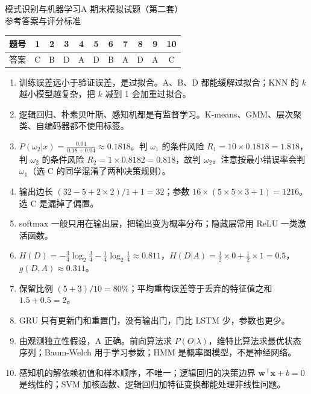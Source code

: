 
\geometry{left=2.4cm,right=2.4cm}
\renewcommand{\coursename}{模式识别与机器学习A\quad 期末模拟试题（第二套）参考答案与评分标准}
\fancyfootoffset[L]{0pt}


\begin{center}
{\LARGE\heiti 模式识别与机器学习A 期末模拟试题（第二套）}\\[4pt]
{\Large\heiti 参考答案与评分标准}
\end{center}

\begin{center}
\renewcommand{\arraystretch}{1.3}
\begin{tabular}{|c|*{10}{c|}}\hline
题号 & 1 & 2 & 3 & 4 & 5 & 6 & 7 & 8 & 9 & 10\\ \hline
答案 & C & B & D & A & D & B & A & D & A & C\\ \hline
\end{tabular}
\end{center}
\begin{enumerate}[label=\arabic*.]
\item 训练误差远小于验证误差，是过拟合。A、B、D 都能缓解过拟合；KNN 的 $k$ 越小模型越复杂，把 $k$ 减到 1 会加重过拟合。
\item 逻辑回归、朴素贝叶斯、感知机都是有监督学习。K-means、GMM、层次聚类、自编码器都不使用标签。
\item $P(\omega_2|x)=\frac{0.04}{0.18+0.04}\approx0.1818$。判 $\omega_1$ 的条件风险 $R_1=10\times0.1818=1.818$，判 $\omega_2$ 的条件风险 $R_2=1\times0.8182=0.818$，故判 $\omega_2$。注意按最小错误率会判 $\omega_1$（选 C 的同学混淆了两种决策规则）。
\item 输出边长 $(32-5+2\times2)/1+1=32$；参数 $16\times(5\times5\times3+1)=1216$。选 C 是漏掉了偏置。
\item softmax 一般只用在输出层，把输出变为概率分布；隐藏层常用 ReLU 一类激活函数。
\item $H(D)=-\frac34\log_2\frac34-\frac14\log_2\frac14\approx0.811$，$H(D|A)=\frac12\times0+\frac12\times1=0.5$，$g(D,A)\approx0.311$。
\item 保留比例 $(5+3)/10=80\%$；平均重构误差等于丢弃的特征值之和 $1.5+0.5=2$。
\item GRU 只有更新门和重置门，没有输出门，门比 LSTM 少，参数也更少。
\item 由观测独立性假设，A 正确。前向算法求 $P(O|\lambda)$，维特比算法求最优状态序列；Baum-Welch 用于学习参数；HMM 是概率图模型，不是神经网络。
\item 感知机的解依赖初值和样本顺序，不唯一；逻辑回归的决策边界 $\bm w^\top\bm x+b=0$ 是线性的；SVM 加核函数、逻辑回归加特征变换都能处理非线性问题。
\end{enumerate}

